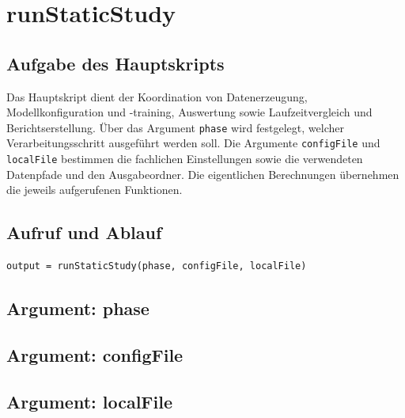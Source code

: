 ﻿\documentclass[11pt,a4paper]{article}
\begin{document}
\section{runStaticStudy}

\subsection{Aufgabe des Hauptskripts}
Das Hauptskript dient der Koordination von Datenerzeugung, Modellkonfiguration
und -training, Auswertung sowie Laufzeitvergleich und Berichtserstellung.
Über das Argument \texttt{phase} wird festgelegt, welcher Verarbeitungsschritt
ausgeführt werden soll. Die Argumente \texttt{configFile} und
\texttt{localFile} bestimmen die fachlichen Einstellungen sowie die
verwendeten Datenpfade und den Ausgabeordner. Die eigentlichen Berechnungen
übernehmen die jeweils aufgerufenen Funktionen.

\subsection{Aufruf und Ablauf}
\begin{verbatim}
output = runStaticStudy(phase, configFile, localFile)
\end{verbatim}
\vspace{2\baselineskip}

\subsection{Argument: phase}
\vspace{2\baselineskip}

\subsection{Argument: configFile}
\vspace{2\baselineskip}

\subsection{Argument: localFile}
\vspace{2\baselineskip}
\end{document}
